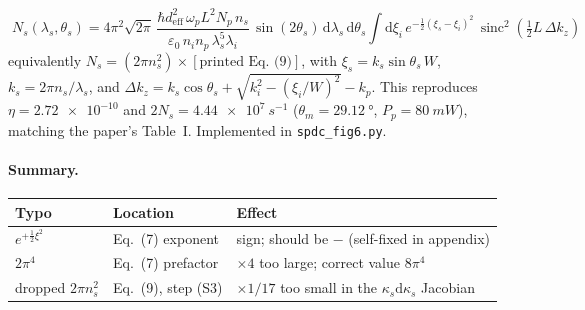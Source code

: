 \documentclass[11pt]{article}
\newcommand{\sinc}{\operatorname{sinc}}
\newcommand{\dd}{\mathrm{d}}
\begin{document}
\begin{equation}
\boxed{\;
N_s(\lambda_s,\theta_s) =
4\pi^2\sqrt{2\pi}\,
\frac{\hbar d_{\mathrm{eff}}^2\,\omega_p L^2 N_p\, n_s}
{\varepsilon_0\, n_i n_p\,\lambda_s^5\lambda_i}\,
\sin(2\theta_s)\,\dd\lambda_s\,\dd\theta_s
\int \dd\xi_i\, e^{-\frac12(\xi_s-\xi_i)^2}\,
\sinc^2\!\left(\tfrac12 L\,\Delta k_z\right)
\;}
\end{equation}
equivalently $N_s = (2\pi n_s^2)\times[\text{printed Eq.~(9)}]$, with
$\xi_s=k_s\sin\theta_s\,W$, $k_s=2\pi n_s/\lambda_s$, and
$\Delta k_z = k_s\cos\theta_s + \sqrt{k_i^2-(\xi_i/W)^2} - k_p$.
This reproduces $\eta=\num{2.72e-10}$ and $2N_s=\SI{4.44e7}{s^{-1}}$
($\theta_m=\SI{29.12}{\degree}$, $P_p=\SI{80}{mW}$), matching the paper's
Table~I. Implemented in \texttt{spdc\_fig6.py}.

\paragraph{Summary.}
\begin{center}
\begin{tabular}{lll}
\hline
Typo & Location & Effect\\
\hline
$e^{+\frac12\xi^2}$ & Eq.~(7) exponent & sign; should be $-$ (self-fixed in appendix)\\
$2\pi^4$ & Eq.~(7) prefactor & $\times 4$ too large; correct value $8\pi^4$\\
dropped $2\pi n_s^2$ & Eq.~(9), step (S3) & $\times 1/17$ too small in the $\kappa_s\dd\kappa_s$ Jacobian\\
\hline
\end{tabular}
\end{center}
\end{document}

